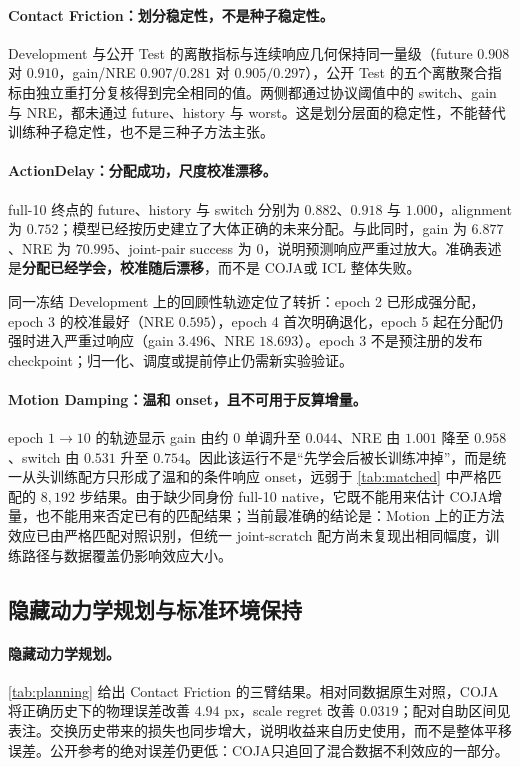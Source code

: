 \documentclass[UTF8,zihao=-4,fontset=fandol]{ctexart}
\newcommand{\method}{\textsc{COJA}}
\begin{document}
\paragraph{Contact Friction：划分稳定性，不是种子稳定性。}
Development 与公开 Test 的离散指标与连续响应几何保持同一量级（future $0.908$ 对 $0.910$，gain/NRE $0.907/0.281$ 对 $0.905/0.297$），公开 Test 的五个离散聚合指标由独立重打分复核得到完全相同的值。两侧都通过协议阈值中的 switch、gain 与 NRE，都未通过 future、history 与 worst。这是划分层面的稳定性，不能替代训练种子稳定性，也不是三种子方法主张。

\paragraph{ActionDelay：分配成功，尺度校准漂移。}
full-10 终点的 future、history 与 switch 分别为 $0.882$、$0.918$ 与 $1.000$，alignment 为 $0.752$；模型已经按历史建立了大体正确的未来分配。与此同时，gain 为 $6.877$、NRE 为 $70.995$、joint-pair success 为 $0$，说明预测响应严重过放大。准确表述是\textbf{分配已经学会，校准随后漂移}，而不是 \method 或 ICL 整体失败。

同一冻结 Development 上的回顾性轨迹定位了转折：epoch 2 已形成强分配，epoch 3 的校准最好（NRE $0.595$），epoch 4 首次明确退化，epoch 5 起在分配仍强时进入严重过响应（gain $3.496$、NRE $18.693$）。epoch 3 不是预注册的发布 checkpoint；归一化、调度或提前停止仍需新实验验证。

\paragraph{Motion Damping：温和 onset，且不可用于反算增量。}
epoch $1\rightarrow10$ 的轨迹显示 gain 由约 $0$ 单调升至 $0.044$、NRE 由 $1.001$ 降至 $0.958$、switch 由 $0.531$ 升至 $0.754$。因此该运行不是“先学会后被长训练冲掉”，而是统一从头训练配方只形成了温和的条件响应 onset，远弱于 \cref{tab:matched} 中严格匹配的 $8{,}192$ 步结果。由于缺少同身份 full-10 native，它既不能用来估计 \method 增量，也不能用来否定已有的匹配结果；当前最准确的结论是：Motion 上的正方法效应已由严格匹配对照识别，但统一 joint-scratch 配方尚未复现出相同幅度，训练路径与数据覆盖仍影响效应大小。

\subsection{隐藏动力学规划与标准环境保持}

\paragraph{隐藏动力学规划。}
\cref{tab:planning} 给出 Contact Friction 的三臂结果。相对同数据原生对照，\method 将正确历史下的物理误差改善 $4.94$ px，scale regret 改善 $0.0319$；配对自助区间见表注。交换历史带来的损失也同步增大，说明收益来自历史使用，而不是整体平移误差。公开参考的绝对误差仍更低：\method 只追回了混合数据不利效应的一部分。
\end{document}
